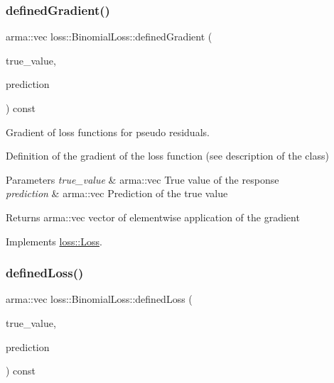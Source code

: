 \mbox{\label{classloss_1_1_binomial_loss_a47a27e1be3e7f2c275046b42557ca21a}} 
\subsubsection{\texorpdfstring{defined\+Gradient()}{definedGradient()}}
{\footnotesize\ttfamily arma\+::vec loss\+::\+Binomial\+Loss\+::defined\+Gradient (\begin{DoxyParamCaption}\item[{const arma\+::vec \&}]{true\+\_\+value,  }\item[{const arma\+::vec \&}]{prediction }\end{DoxyParamCaption}) const\hspace{0.3cm}{\ttfamily [virtual]}}



Gradient of loss functions for pseudo residuals. 

Definition of the gradient of the loss function (see description of the class)


\begin{DoxyParams}{Parameters}
{\em true\+\_\+value} & {\ttfamily arma\+::vec} True value of the response \\
\hline
{\em prediction} & {\ttfamily arma\+::vec} Prediction of the true value\\
\hline
\end{DoxyParams}
\begin{DoxyReturn}{Returns}
{\ttfamily arma\+::vec} vector of elementwise application of the gradient 
\end{DoxyReturn}


Implements \hyperlink{classloss_1_1_loss_a267a4de70747ade4b2d84ce35a448979}{loss\+::\+Loss}.

\mbox{\label{classloss_1_1_binomial_loss_aa4570a731257ba43b1b4d6099c0a4515}} 
\subsubsection{\texorpdfstring{defined\+Loss()}{definedLoss()}}
{\footnotesize\ttfamily arma\+::vec loss\+::\+Binomial\+Loss\+::defined\+Loss (\begin{DoxyParamCaption}\item[{const arma\+::vec \&}]{true\+\_\+value,  }\item[{const arma\+::vec \&}]{prediction }\end{DoxyParamCaption}) const\hspace{0.3cm}{\ttfamily [virtual]}}



